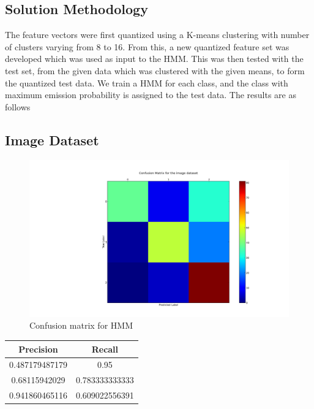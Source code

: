 \documentclass[11pt,a4paper]{article}
\begin{document}
\subsection{Solution Methodology}
The feature vectors were first quantized using a K-means clustering with number of clusters varying from 8 to 16. From this, a new quantized feature set was developed which was used as input to the HMM. This was then tested with the test set, from the given data which was clustered with the given means, to form the  quantized test data. We train a HMM for each class, and the class with maximum emission probability is assigned to the test data. The results are as follows
\subsection{Image Dataset}
\begin{figure}[H]
  \centering
  \includegraphics[width=.8\linewidth]{confusion_image_2.png}
\caption{Confusion matrix for HMM}
  \label{fig:sfig1}
\end{figure}%
\begin{center}
\begin{tabular}{|c|c|}
\hline
\textbf{Precision} & \textbf{Recall} \\ \hline
0.487179487179 & 0.95 \\ \hline
0.68115942029 & 0.783333333333 \\ \hline
0.941860465116 & 0.609022556391 \\ \hline
\end{tabular}

\end{center}
\end{document}
